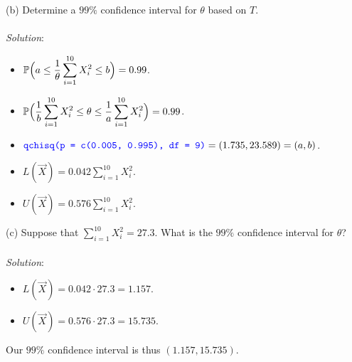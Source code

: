\documentclass[12pt]{article}
\newcommand{\XBB}{\color{blue}}
\newcommand{\ds}{\displaystyle}
\begin{document}
(b) Determine a $ 99\% $ confidence interval for $ \theta $ based on $ T $. \\
\vspace{2.5mm} \\
\textit{Solution}:
\vspace{2.5mm} \\

\begin{itemize}
    \item $ \ds \mathbb{P} \Bigl( a \le \frac{1}{\theta} \sum_{i=1}^{10} X_{i}^{2} \le b \Bigr) = 0.99 $. \\
    \item $ \ds \mathbb{P} \Bigl( \frac{1}{b} \sum_{i=1}^{10} X_{i}^{2} \le \theta \le \frac{1}{a} \sum_{i=1}^{10} X_{i}^{2} \Bigr) = 0.99 $. \\
    \item $ \ds {\XBB \texttt{qchisq(p = c(0.005, 0.995), df = 9)}} = (1.735, 23.589) = (a, b) $.
    \item $ \ds L(\overrightarrow{X}) = 0.042 \sum_{i=1}^{10} X_{i}^{2} $. \\
    \item $ \ds U(\overrightarrow{X}) = 0.576 \sum_{i=1}^{10} X_{i}^{2} $. \\
\end{itemize}

\vspace{2.5mm}

(c) Suppose that $ \ds \sum_{i=1}^{10} X_{i}^{2} = 27.3 $. 
What is the $ 99\% $ confidence interval for $ \theta $? \\
\vspace{2.5mm} \\
\textit{Solution}:
\vspace{2.5mm} \\

\begin{itemize}
    \item $ \ds L(\overrightarrow{X}) = 0.042 \cdot 27.3 = 1.157 $. \\
    \item $ \ds U(\overrightarrow{X}) = 0.576 \cdot 27.3 = 15.735 $. \\
\end{itemize}

\noindent
Our $ 99\% $ confidence interval is thus $ (1.157, 15.735) $. \\
\end{document}
